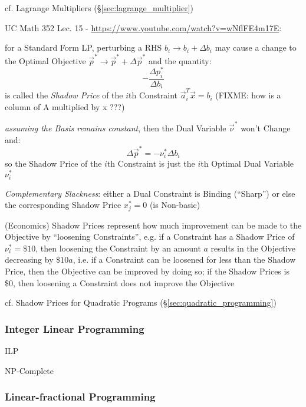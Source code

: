 cf. Lagrange Multipliers (\S\ref{sec:lagrange_multiplier})

UC Math 352 Lec. 15 - \url{https://www.youtube.com/watch?v=wNflFE4m17E}:

for a Standard Form LP, perturbing a RHS $b_i \rightarrow b_i + \Delta{b_i}$
may cause a change to the Optimal Objective
$\vec{p}^* \rightarrow \vec{p}^* + \Delta{\vec{p}^*}$ and the quantity:
\[
  -\frac{\Delta p_i^*}{\Delta b_i}
\]
is called the \emph{Shadow Price} of the $i$th Constraint $\vec{a}_i^T\vec{x} =
b_i$
(FIXME: how is a column of A multiplied by x ???)

\emph{assuming the Basis remains constant}, then the Dual Variable
$\vec{\nu}^*$ won't Change and:
\[
  \Delta \vec{p}^* = - \nu_i^* \Delta b_i
\]
so the Shadow Price of the $i$th Constraint is just the $i$th Optimal Dual
Variable $\nu_i^*$

\emph{Complementary Slackness}: either a Dual Constraint is Binding (``Sharp'')
or else the corresponding Shadow Price $x_j^* = 0$ (is Non-basic)

(Economics) Shadow Prices represent how much improvement can be made to the
Objective by ``loosening Constraints'', e.g. if a Constraint has a Shadow Price
of $\nu_i^* = \$10$, then loosening the Constraint by an amount $a$ results in
the Objective decreasing by $\$10 a$, i.e. if a Constraint can be loosened for
less than the Shadow Price, then the Objective can be improved by doing so; if
the Shadow Prices is \$0, then loosening a Constraint does not improve the
Objective

\fist cf. Shadow Prices for Quadratic Programs
(\S\ref{sec:quadratic_programming})



\subsubsection{Integer Linear Programming}\label{sec:integer_linear_programming}

ILP

NP-Complete



\subsubsection{Linear-fractional Programming}
\label{sec:linear_fractional_programming}



